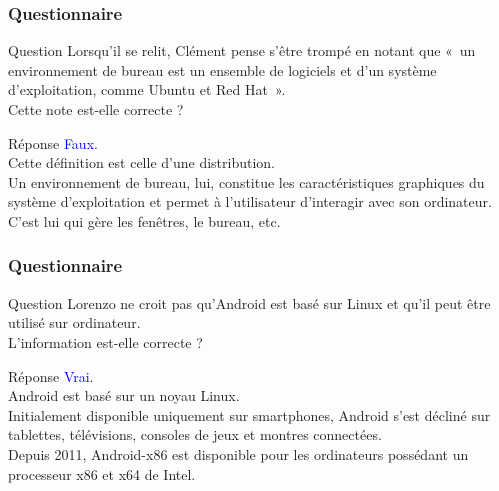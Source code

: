 \documentclass[aspectratio=169]{beamer}
\begin{document}
\begin{frame}
  \frametitle{Questionnaire}
  \begin{exampleblock}{Question}
    Lorsqu’il se relit, Clément pense s’être trompé en notant que « un
    environnement de bureau est un ensemble de logiciels et d’un système
    d’exploitation, comme Ubuntu et Red Hat ». \\
    Cette note est-elle correcte ?
  \end{exampleblock}

  \pause

  \begin{block}{Réponse}
    \textcolor{blue}{Faux}. \\
    Cette définition est celle d'une distribution. \\
    Un environnement de bureau, lui, constitue les caractéristiques graphiques
    du système d’exploitation et permet à l’utilisateur d’interagir avec son
    ordinateur. \\
    C'est lui qui gère les fenêtres, le bureau, etc.
  \end{block}
\end{frame}

\begin{frame}
  \frametitle{Questionnaire}
  \begin{exampleblock}{Question}
    Lorenzo ne croit pas qu’Android est basé sur Linux et qu’il peut être
    utilisé sur ordinateur. \\
    L’information est-elle correcte ?
  \end{exampleblock}

  \pause

  \begin{block}{Réponse}
    \textcolor{blue}{Vrai}. \\
    Android est basé sur un noyau Linux. \\
    Initialement disponible uniquement sur smartphones, Android s'est décliné sur
    tablettes, télévisions, consoles de jeux et montres connectées. \\
    Depuis 2011, Android-x86 est disponible pour les ordinateurs possédant un
    processeur x86 et x64 de Intel.
  \end{block}
\end{frame}
\end{document}
